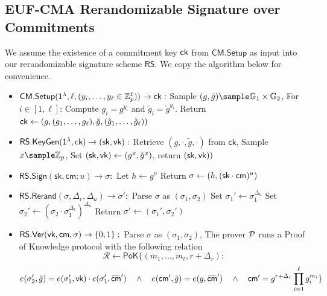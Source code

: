 \subsection{EUF-CMA Rerandomizable Signature over Commitments}\label{sig-construction}
We assume the existence of a commitment key $\mathsf{ck}$ from $\mathsf{CM.Setup}$ as input into our rerandomizable signature scheme $\mathsf{RS}$. We copy the algorithm below for convenience.
\begin{itemize}
    \item $\mathsf{CM.Setup}(\mathsf{1^{\lambda}}, \ell, (y_i, \ldots, y_{\ell} \in \mathbb{Z}_p^{\ell})) \to \mathsf{ck}:$  
    Sample $(g, \tilde{g}) \sample \G_1 \times \G_2$, For $i \in [1,\ell]$: Compute $g_i = g^{y_i}$ and $\tilde{g}_i = \tilde{g}^{y_i}$. Return $\mathsf{ck} \gets (g, (g_1,\ldots,g_\ell), \tilde{g}, (\tilde{g}_1,\ldots,\tilde{g}_\ell))$
    
    \item $\mathsf{RS.KeyGen}(\mathsf{1^{\lambda}}, \mathsf{ck}) \to (\mathsf{sk}, \mathsf{vk}):$ 
        Retrieve $(g, \cdot, \tilde{g}, \cdot)$ from $\mathsf{ck}$,
        Sample $x \sample \Z_p$,
        Set $(\mathsf{sk}, \mathsf{vk}) \gets (g^x, \tilde{g}^x)$, return $(\mathsf{sk}, \mathsf{vk}))$
    
    \item $\mathsf{RS.Sign}(\mathsf{sk}, \mathsf{cm}; u) \to \sigma:$ 
        Let $h \gets g^u$
        Return $\sigma \gets (h, (\mathsf{sk} \cdot \mathsf{cm})^u)$
    
    \item $\mathsf{RS.Rerand}(\sigma, \Delta_r, \Delta_u) \to \sigma':$
        Parse $\sigma$ as $(\sigma_1, \sigma_2)$
        Set $\sigma_1' \gets \sigma_1^{\Delta_u}$
        Set $\sigma_2' \gets (\sigma_2 \cdot \sigma_1^{\Delta_r})^{\Delta_u}$
        Return $\sigma' \gets (\sigma_1', \sigma_2')$
    
    \item $\mathsf{RS.Ver}(\mathsf{vk}, \mathsf{cm}, \sigma) \to \{0,1\}:$
        Parse $\sigma$ as $(\sigma_1, \sigma_2)$, The prover $\mathcal{P}$ runs a Proof of Knowledge protocol with the following relation 
    \[
        \mathcal{R} \gets \mathsf{PoK}\{(m_1,\ldots,m_\ell, r + \Delta_r): 
    \]
    \[
         e(\sigma_2', \tilde{g}) = e(\sigma_1', \mathsf{vk})\cdot e(\sigma_1', \widetilde{\mathsf{cm}}') \quad \wedge \quad
        e(\mathsf{cm}', \tilde{g}) = e(g, \widetilde{\mathsf{cm}}') \quad \wedge \quad
        \mathsf{cm}' = g^{r + \Delta_r} \prod_{i=1}^\ell g_i^{m_i}
        \}
    \]
        
\end{itemize}






